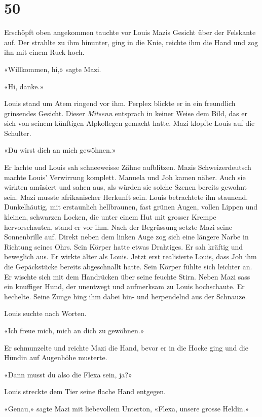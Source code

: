 \chapter{50}



Erschöpft oben angekommen tauchte vor Louis Mazis Gesicht über der
Felskante auf. Der strahlte zu ihm hinunter, ging in die Knie, reichte
ihm die Hand und zog ihn mit einem Ruck hoch.

«Willkommen, hi,» sagte Mazi.

«Hi, danke.»

Louis stand um Atem ringend vor ihm. Perplex blickte er in ein
freundlich grinsendes Gesicht. Dieser \emph{Mitsenn} entsprach in keiner
Weise dem Bild, das er sich von seinem künftigen Alpkollegen gemacht hatte. 
Mazi klopfte Louis auf die Schulter.

«Du wirst dich an mich gewöhnen.»

Er lachte und Louis sah schneeweisse Zähne aufblitzen. Mazis Schweizerdeutsch machte Louis’ Verwirrung
komplett. Manuela und Joh kamen näher. Auch sie wirkten amüsiert und
sahen aus, als würden sie solche Szenen bereits gewohnt sein.
Mazi musste afrikanischer Herkunft sein. Louis betrachtete ihn staunend.
Dunkelhäutig, mit erstaunlich hellbraunen, fast grünen Augen, vollen
Lippen und kleinen, schwarzen Locken, die unter einem Hut mit
grosser Krempe hervorschauten, stand er vor ihm. Nach der Begrüssung
setzte Mazi seine Sonnenbrille auf. Direkt neben dem linken Auge zog
sich eine längere Narbe in Richtung seines Ohrs. Sein Körper hatte etwas
Drahtiges. Er sah kräftig und beweglich aus. Er wirkte älter als
Louis.
Jetzt erst realisierte Louis, dass Joh ihm die Gepäckstücke bereits
abgeschnallt hatte. Sein Körper fühlte sich leichter an. Er wischte sich mit
dem Handrücken über seine feuchte Stirn. Neben Mazi sass ein knuffiger
Hund, der unentwegt und aufmerksam zu Louis hochschaute. Er hechelte.
Seine Zunge hing ihm dabei hin- und herpendelnd aus der Schnauze.

Louis suchte nach Worten.

«Ich freue mich, mich an dich zu gewöhnen.»

Er schmunzelte und reichte Mazi die Hand, bevor er in die Hocke ging und die Hündin auf Augenhöhe musterte. 

«Dann musst du also die Flexa sein, ja?»

Louis streckte dem Tier seine flache Hand entgegen.

«Genau,» sagte Mazi mit liebevollem Unterton, «Flexa, unsere
grosse Heldin.»

